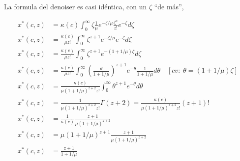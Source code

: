 \documentclass{article}
\def\opt{\ensuremath{^{*}}}
\begin{document}
La formula del denoiser es casi idéntica, con un $\zeta$ ``de más'',

\begin{align}
x\opt(c,z) &= 
  \kappa(c)\int_{0}^{\infty}
  {
    \zeta 
    \frac{1}{\mu}
    e^{-\zeta/\mu}
    \frac{\zeta^z}{z!}
    e^{-\zeta} 
    d\zeta
  } \\
x\opt(c,z) &= 
  \frac{\kappa(c)}{\mu{z!}}
  \int_{0}^{\infty}
  {
    \zeta^{z+1}
    e^{-\zeta/\mu}
    e^{-\zeta} 
    d\zeta
  } \\
x\opt(c,z) &=
  \frac{\kappa(c)}{\mu{z!}}
  \int_{0}^{\infty}
  {
    \zeta^{z+1}
    e^{-(1+1/\mu)\zeta}
    d\zeta
  } \\
x\opt(c,z) &=
\frac{\kappa(c)}{\mu{z!}}\int_{0}^{\infty}
{
  \left(
    \frac{\theta}{1+1/\mu}
  \right)^{z+1}
  e^{-\theta}
  \frac{1}{1+1/\mu}
  d\theta
}
\quad [cv:\;\theta=(1+1/\mu)\zeta] \\
x\opt(c,z) &=
\frac{\kappa(c)}{\mu(1+1/\mu)^{z+2}z!}
\int_{0}^{\infty}
{
  \theta^{z+1}
  e^{-\theta}
  d\theta
} \\
x\opt(c,z) &=
\frac{1}{\mu(1+1/\mu)^{z+2}z!}
\Gamma(z+2) = 
\frac{\kappa(c)}{\mu(1+1/\mu)^{z+2}z!} (z+1)!
\\
x\opt(c,z) &= \frac{1}{\kappa(c)}\frac{z+1}{\mu(1+1/\mu)^{z+2}} \\
x\opt(c,z) &= \mu(1+1/\mu)^{z+1}\frac{z+1}{\mu(1+1/\mu)^{z+2}} \\
x\opt(c,z) &= \frac{z+1}{1+1/\mu} \\
\end{align}
\end{document}
